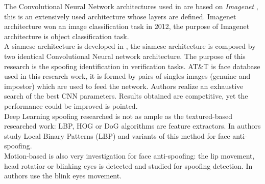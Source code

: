 The Convolutional Neural Network architectures used in \cite{yangLL14,LSTM-CNN} are based on \textit{Imagenet} \cite{imagenet}, this is an extensively used architecture whose layers are defined. Imagenet architecture won an image classification task in 2012, the purpose of Imagenet architecture is object classification task.\\

A siamese architecture is developed in \cite{Verification}, the siamese architecture is composed by two identical Convolutional Neural network architecture. The purpose of this research is the spoofing identification in verification tasks. AT\&T is face database used in this research work, it is formed by pairs of singles images (genuine and impostor) which are used to feed the network.  Authors realize an exhaustive search of the best CNN parameters. Results obtained are competitive, yet the performance could be improved is pointed.\\

Deep Learning spoofing researched is not as ample as the textured-based researched work: LBP, HOG or DoG algorithms are feature extractors. In \cite{LBP_FaceAnti} authors study Local Binary Patterns (LBP) and variants of this method for face anti-spoofing.\\

Motion-based is also very investigation for face anti-spoofing: the lip movement, head rotatior or blinking eyes is detected and studied for spoofing detection. In \cite{Blink_antispoofing} authors use the blink eyes movement.\\






